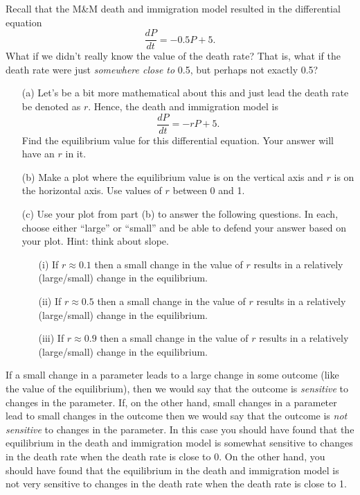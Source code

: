 \begin{problem}
    Recall that the M\&M death and immigration model resulted in the differential equation 
    \[ \frac{dP}{dt} = -0.5 P + 5. \]
    What if we didn't really know the value of the death rate?  That is, what if the death
    rate were just {\it somewhere close to } 0.5, but perhaps not exactly 0.5?  
    \begin{enumerate}
        \item[(a)] Let's be a bit more mathematical about this and just lead the death
            rate be denoted as $r$.  Hence, the death and immigration model is 
            \[ \frac{dP}{dt} = -rP + 5. \]
            Find the equilibrium value for this differential equation.  Your answer will
            have an $r$ in it.
        \item[(b)] Make a plot where the equilibrium value is on the vertical axis and $r$
            is on the horizontal axis.  Use values of $r$ between 0 and 1.
        \item[(c)] Use your plot from part (b) to answer the following questions.  In
            each, choose either ``large'' or ``small'' and be able to defend your answer
            based on your plot.  Hint: think about slope.
            \begin{enumerate}
                \item[(i)] If $r \approx 0.1$ then a small change in the value of $r$
                    results in a relatively (large/small) change in the equilibrium.
                \item[(ii)] If $r \approx 0.5$ then a small change in the value of $r$
                    results in a relatively (large/small) change in the equilibrium.
                \item[(iii)] If $r \approx 0.9$ then a small change in the value of $r$
                    results in a relatively (large/small) change in the equilibrium.
            \end{enumerate}
    \end{enumerate}
\end{problem}

If a small change in a parameter leads to a large change in some outcome (like the value
of the equilibrium), then we would say that the outcome is {\it sensitive} to changes in
the parameter.  If, on the other hand, small changes in a parameter lead to small changes
in the outcome then we would say that the outcome is {\it not sensitive} to changes in the
parameter.  In this case you should have found that the equilibrium in the death and
immigration model is somewhat sensitive to changes in the death rate when the death rate
is close to 0.  On the other hand, you should have found that the equilibrium in the death
and immigration model is not very sensitive to changes in the death rate when the death
rate is close to 1.


